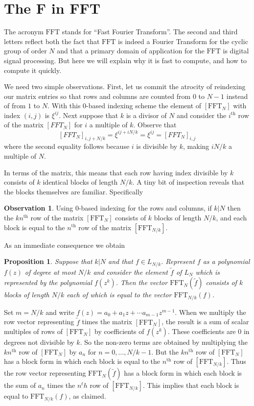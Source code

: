 \documentclass[12pt, letter, oneside]{amsart}
\theoremstyle{definition}
\newtheorem{observation}[para]{Observation}
\theoremstyle{plain}
\newtheorem{proposition}[para]{Proposition}
\numberwithin{equation}{para}
\numberwithin{figure}{section}
\newcommand{\FFT}{\text{FFT}}
\renewcommand{\th}{\text{th}}
\begin{document}
\section{The F in FFT}

The acronym $\FFT$ stands for ``Fast Fourier Transform''.  The second and
third letters reflect both the fact that $\FFT$ is indeed a Fourier Transform
for the cyclic group of order $N$ and that a primary domain of application
for the $\FFT$ is digital signal processing.  But here we will explain why
it is fast to compute, and how to compute it quickly.

We need two simple observations.  First, let us commit the atrocity of
reindexing our matrix entries so that rows and columns are counted
from $0$ to $N-1$ instead of from $1$ to $N$.  With this $0$-based
indexing scheme the element of $[\FFT_N]$ with index $(i,j)$ is
$\xi^{ij}$.  Next suppose that $k$ is a divisor of $N$ and consider
the $i^\th$ row of the matrix $[FFT_N]$ for $i$ a multiple of $k$.
Observe that
$$[FFT_N]_{i,j+N/k} = \xi^{ij + iN/k} = \xi^{ij} = [FFT_N]_{i,j}$$
where the second equality follows because $i$ is divisible by $k$, making
$iN/k$ a multiple of $N$.

In terms of the matrix, this means that each row having index divisible
by $k$ consists of $k$ identical blocks of length $N/k$.  A tiny bit of
inspection reveals that the blocks themselves are familiar.  Specifically

\begin{observation}\label{observation:block}
Using $0$-based indexing for the rows and columns, if $k|N$ then the
$kn^\th$ row of the matrix $[\FFT_N]$ consists of $k$ blocks of length
$N/k$, and each block is equal to the $n^\th$ row of the matrix
$[\FFT_{N/k}]$.
\end{observation}

As an immediate consequence we obtain 
\begin{proposition}
Suppose that $k|N$ and that $f\in L_{N/k}$.  Represent $f$ as a
polynomial $f(z)$ of degree at most $N/k$ and consider the element
$\widetilde f$ of $L_N$ which is represented by the polynomial
$f(z^k)$.  Then the vector $\FFT_N(\widetilde f)$ consists of $k$
blocks of length $N/k$ each of which is equal to the vector
$\FFT_{N/k}(f)$.
\end{proposition}
\proof Set $m = N/k$ and write
$f(z) = a_0 + a_1z + \cdots a_{m-1}z^{m-1}$.  When we multiply the row
vector representing $\widetilde f$ times the matrix $[\FFT_N]$, the
result is a sum of scalar multiples of rows of $[\FFT_N]$ by
coefficients of $f(z^k)$.  These coefficients are $0$ in degrees not
divisible by $k$.  So the non-zero terms are obtained by multiplying
the $kn^\th$ row of $[\FFT_N]$ by $a_n$ for $n=0, \ldots, N/k-1$.  But
the $kn^\th$ row of $[\FFT_N]$ has a block form in which each block is
equal to the $n^\th$ row of $[\FFT_{N/k}]$.  Thus the row vector
representing $\FFT_N(\widetilde f)$ has a block form in which each
block is the sum of $a_n$ times the $n^th$ row of $[\FFT_{N/k}]$.
This implies that each block is equal to $\FFT_{N/k}(f)$, as claimed.
\endproof
\end{document}
